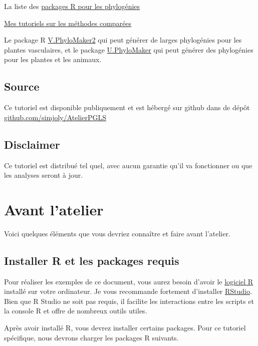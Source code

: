 \documentclass[
]{book}
\begin{document}
La liste des \href{https://cran.r-project.org/web/views/Phylogenetics.html}{packages R pour les phylogénies}

\href{http://github.com/simjoly/CourseComparativeMethods/}{Mes tutoriels sur les méthodes comparées}

Le package R \href{https://doi.org/10.1016/j.pld.2022.05.005}{V.PhyloMaker2} qui peut générer de larges phylogénies pour les plantes vasculaires, et le package \href{https://doi.org/10.1016/j.pld.2022.12.007}{U.PhyloMaker} qui peut générer des phylogénies pour les plantes et les animaux.

\section{Source}\label{source}

Ce tutoriel est disponible publiquement et est hébergé sur github dans de dépôt \href{https://github.com/simjoly/AtelierPGLS}{github.com/simjoly/AtelierPGLS}

\section{Disclaimer}\label{disclaimer}

Ce tutoriel est distribué tel quel, avec aucun garantie qu'il va fonctionner ou que les analyses seront à jour.

\chapter{Avant l'atelier}\label{before}

Voici quelques éléments que vous devriez connaître et faire avant l'atelier.

\section{Installer R et les packages requis}\label{installer-r-et-les-packages-requis}

Pour réaliser les exemples de ce document, vous aurez besoin d'avoir le \href{https://www.r-project.org/}{logiciel R} installé sur votre ordinateur. Je vous recommande fortement d'installer \href{https://rstudio.com/}{RStudio}. Bien que R Studio ne soit pas requis, il facilite les interactions entre les scripts et la console R et offre de nombreux outils utiles.

Après avoir installé R, vous devrez installer certains packages. Pour ce tutoriel spécifique, nous devrons charger les packages R suivants.
\end{document}

